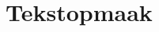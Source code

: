 \documentclass[presentatie.tex]{subfiles}
\begin{document}
	\section{Tekstopmaak}
	\clearrecentlist
	
	
	
	
	
\end{document}
